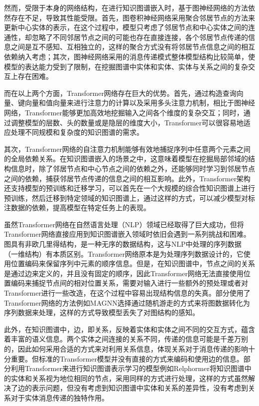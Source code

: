 然而，受限于本身的网络结构，在进行知识图谱嵌入时，基于图神经网络的方法依然存在不足，导致其性能受限。首先，图卷积神经网络采用聚合邻居节点的方法来更新中心实体的表示，在这个过程中，模型只考虑了邻居节点和中心实体之间的连通性，却忽略了不同邻居节点之间的可能也存在直接连接，各个邻居节点传递的信息之间是互不感知、互相独立的，这样的聚合方式没有将邻居节点信息之间的相互依赖纳入考虑；其次，图神经网络采用的消息传递模式整体模型结构比较简单，使模型的表达能力受到了限制，在挖掘图谱中实体和实体、实体与关系之间的复杂交互上存在困难。

而在以上两个方面，Transformer网络存在巨大的优势。首先，通过构造查询向量、键向量和值向量来进行注意力的计算以及采用多头注意力机制，相比于图神经网络，Transformer能够更加高效地挖掘输入之间各个维度的复杂交互；同时，通过调整模型的层数、头的数量或是隐层的维度大小，Transformer可以很容易地适应处理不同规模和复杂度的知识图谱的需求。

其次，Transformer网络的自注意力机制能够有效地捕捉序列中任意两个元素之间的全局依赖关系。在知识图谱嵌入的场景之中，这意味着模型在挖掘局部邻域的结构信息时，除了邻居节点和中心节点之间的依赖之外，还能够同时学习到邻居节点之间的依赖，捕获邻居节点传递的信息之间的相互影响。此外，Transformer架构还支持模型的预训练和迁移学习，可以首先在一个大规模的综合性知识图谱上进行预训练，然后迁移到特定领域的知识图谱上，通过这样的方式，可以减少模型对标注数据的依赖，提高模型在特定任务上的表现。

虽然Transformer网络在自然语言处理（NLP）领域已经取得了巨大成功，但将Transformer网络直接应用到知识图谱嵌入领域时依旧会遇到一系列挑战和困难。图具有非欧几里得结构，是一种无序的数据结构，这与NLP中处理的序列数据（一维结构）有本质区别。Transformer网络原本是为处理序列数据设计的，它使用位置编码来保留序列中元素的顺序信息。但是，在知识图谱中，节点之间的关系是通过边来定义的，并且没有固定的顺序，因此Transformer网络无法直接使用位置编码来捕捉节点间的相对位置关系，需要对输入进行一些额外的预处理或者对Transformer进行一些改造，在这个过程中容易出现结构信息的失真。部分使用了Transformer网络的方法例如MAGNN选择通过随机游走的方式来将图数据转化为序列数据来处理，这样的方式导致模型丢失了对图结构的感知。

此外，在知识图谱中，边，即关系，反映着实体和实体之间不同的交互方式，蕴含着丰富的语义信息。两个实体之间连接的关系不同，传递的信息可能是千差万别的，因此如何采用合适的方式来对利用关系信息，体现关系对于消息传递的影响十分重要。但标准的Transformer模型并没有直接的方式来编码和使用边的信息。部分利用Transformer来进行知识图谱表示学习的模型例如Relphormer将知识图谱中的实体和关系视为地位相同的节点，采用同样的方式进行处理，这样的方式虽然解决了边的表示问题，但没有考虑到知识图谱中实体和关系的差异性，没有考虑到关系对于实体消息传递的独特作用。

